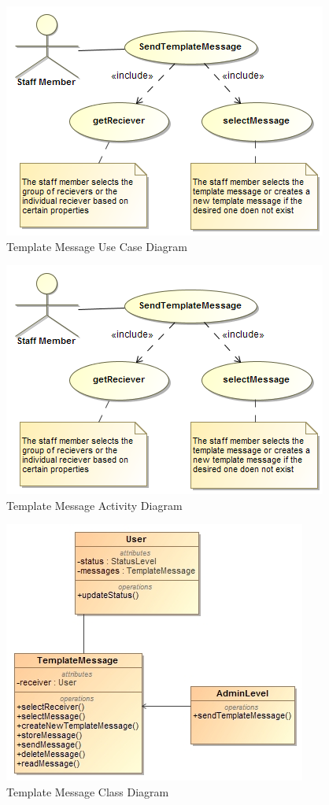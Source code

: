 \documentclass[11pt]{article}
\begin{document}
\begin{enumerate}
\graphicspath{ {../Diagrams/Maret/usecase/} }	
	\begin{figure}[H]	
    	\includegraphics[scale=0.5]{TemplateMessage.png}
    	\caption{Template Message Use Case Diagram}
	\end{figure}
	
\graphicspath{ {../Diagrams/Maret/activity/} }
	\begin{figure}[H]	
    	\includegraphics[scale=0.5]{TemplateMessage.png}
    	\caption{Template Message Activity Diagram}
	\end{figure}

\graphicspath{ {../Diagrams/Maret/class/} }
	\begin{figure}[H]	
    	\includegraphics[scale=0.5]{TemplateMessages.jpg}
    	\caption{Template Message Class Diagram}
	\end{figure}		


\end{enumerate}
\end{document}
